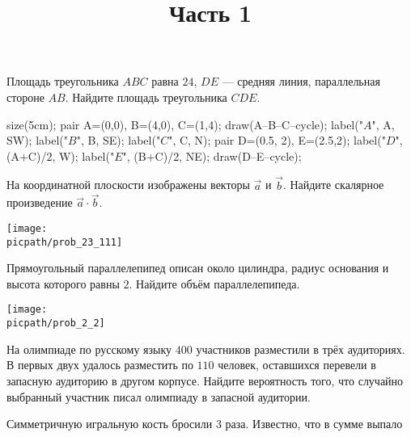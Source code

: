 %
%

\begin{training}[1]
	\title{Часть 1}
	\egepreambone
	\begin{listofex}
		\item
		\begin{minipage}[t]{\bodywidth}
		Площадь треугольника \(ABC\) равна \(24\), \(DE\) --- средняя линия, параллельная стороне \(AB\). Найдите площадь треугольника \(CDE\).
			\foranswer
		\end{minipage}
		\gapwidth
		\begin{minipage}[t]{\picwidth}
				\begin{asy}
				size(5cm);
				pair A=(0,0), B=(4,0), C=(1,4);
				draw(A--B--C--cycle);
				label("$A$", A, SW);
				label("$B$", B, SE);
				label("$C$", C, N);
				pair D=(0.5, 2), E=(2.5,2);
				label("\(D\)", (A+C)/2, W);
				label("\(E\)", (B+C)/2, NE);
				draw(D--E--cycle);
				\end{asy}
		\end{minipage}
		\item
		На координатной плоскости изображены векторы \(\overrightarrow{a}\) и \(\overrightarrow{b}\). Найдите скалярное
		произведение \(\overrightarrow{a}\cdot\overrightarrow{b}\).
		\begin{center}
			\texttt{[image: \\picpath/prob\_23\_111]}
		\end{center}
		\foranswer
		\item 
		\begin{minipage}[t]{\bodywidth}
			Прямоугольный параллелепипед описан около цилиндра, радиус основания и высота которого равны \( 2 \). Найдите объём параллелепипеда.
			\foranswer
		\end{minipage}
		\gapwidth
		\begin{minipage}[t]{\picwidth}
			\texttt{[image: \\picpath/prob\_2\_2]}
		\end{minipage}
	\newpage
	\phantom{Часть 1}
		\item На олимпиаде по русскому языку \( 400 \) участников разместили в трёх аудиториях. В первых двух удалось разместить по \( 110 \) человек, оставшихся перевели в запасную аудиторию в другом корпусе. Найдите вероятность того, что случайно выбранный участник писал олимпиаду в запасной аудитории.
		\foranswer
		\item Симметричную игральную кость бросили \(3\) раза. Известно, что в сумме выпало

\end{listofex}
\end{training}
